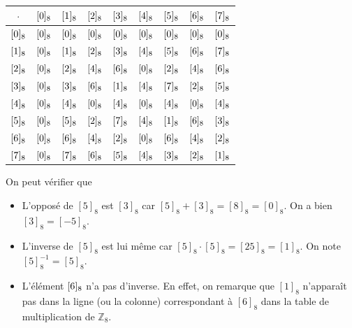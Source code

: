 \begin{exemple}
\begin{minipage}[t]{0.45\linewidth}
		\renewcommand{\arraystretch}{1.2}
		\setlength{\tabcolsep}{3pt}
		\footnotesize 
		\begin{tabular}{c|cccccccc}
			$\cdot$ & $\cl[8]{0}$ & $\cl[8]{1}$ & $\cl[8]{2}$ & $\cl[8]{3}$ & $\cl[8]{4}$ & $\cl[8]{5}$ & $\cl[8]{6}$ & $\cl[8]{7}$ \\ \hline
			$\cl[8]{0}$ & $\cl[8]{0}$ & $\cl[8]{0}$ & $\cl[8]{0}$ & $\cl[8]{0}$ & $\cl[8]{0}$ & $\cl[8]{0}$ & $\cl[8]{0}$ & $\cl[8]{0}$ \\
			$\cl[8]{1}$ & $\cl[8]{0}$ & $\cl[8]{1}$ & $\cl[8]{2}$ & $\cl[8]{3}$ & $\cl[8]{4}$ & $\cl[8]{5}$ & $\cl[8]{6}$ & $\cl[8]{7}$ \\
			$\cl[8]{2}$ & $\cl[8]{0}$ & $\cl[8]{2}$ & $\cl[8]{4}$ & $\cl[8]{6}$ & $\cl[8]{0}$ & $\cl[8]{2}$ & $\cl[8]{4}$ & $\cl[8]{6}$ \\
			$\cl[8]{3}$ & $\cl[8]{0}$ & $\cl[8]{3}$ & $\cl[8]{6}$ & $\cl[8]{1}$ & $\cl[8]{4}$ & $\cl[8]{7}$ & $\cl[8]{2}$ & $\cl[8]{5}$ \\
			$\cl[8]{4}$ & $\cl[8]{0}$ & $\cl[8]{4}$ & $\cl[8]{0}$ & $\cl[8]{4}$ & $\cl[8]{0}$ & $\cl[8]{4}$ & $\cl[8]{0}$ & $\cl[8]{4}$ \\
			$\cl[8]{5}$ & $\cl[8]{0}$ & $\cl[8]{5}$ & $\cl[8]{2}$ & $\cl[8]{7}$ & $\cl[8]{4}$ & $\cl[8]{1}$ & $\cl[8]{6}$ & $\cl[8]{3}$ \\
			$\cl[8]{6}$ & $\cl[8]{0}$ & $\cl[8]{6}$ & $\cl[8]{4}$ & $\cl[8]{2}$ & $\cl[8]{0}$ & $\cl[8]{6}$ & $\cl[8]{4}$ & $\cl[8]{2}$ \\
			$\cl[8]{7}$ & $\cl[8]{0}$ & $\cl[8]{7}$ & $\cl[8]{6}$ & $\cl[8]{5}$ & $\cl[8]{4}$ & $\cl[8]{3}$ & $\cl[8]{2}$ & $\cl[8]{1}$ \\
		\end{tabular}
	\end{minipage}
	
	\bigskip
	
	On peut vérifier que 
	\begin{itemize}
		\item L'opposé de $[5]_8$ est $[3]_8$ car $[5]_8 + [3]_8 = [8]_8 = [0]_8$. On a bien $[3]_8 = [-5]_8$.
		
		\item L'inverse de $[5]_8$ est lui même car $[5]_8 \cdot [5]_8 = [25]_8 = [1]_8 $. On note $[5]_8 ^{-1} = [5]_8 $.
		
		\item L'élément $\cl[8]{6}$ n'a pas d'inverse. En effet, on remarque  que  $[1]_8$ n’apparaît pas dans la ligne (ou la colonne) correspondant à $[6]_8$ dans la table de multiplication de $\mathbb{Z}_8$.
	\end{itemize}
\end{exemple}


